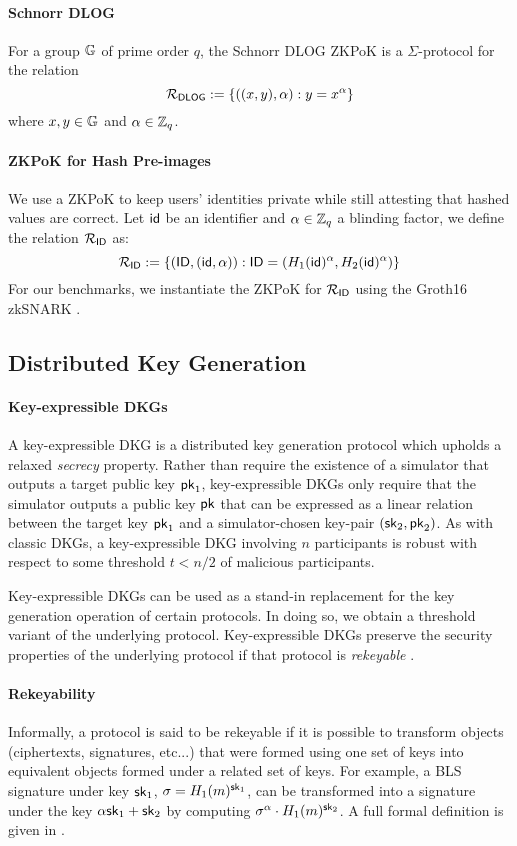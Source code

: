 	\paragraph{Schnorr DLOG} For a group $\mathbb{G}$ of prime order $q$, the Schnorr DLOG ZKPoK is a $\Sigma$-protocol for the relation 
	$$\mathcal{R}_{\mathsf{DLOG}}:= \left\{ ((x, y), \alpha): y = x^\alpha \right\}$$ 
	where $x, y \in \mathbb{G}$ and $\alpha \in \mathbb{Z}_q$.

	\paragraph{ZKPoK for Hash Pre-images} We use a ZKPoK to keep users' identities private while still attesting that hashed values are correct. Let $\mathsf{id}$ be an identifier and $\alpha \in \mathbb{Z}_q$ a blinding factor, we define the relation $\mathcal{R}_{\mathsf{ID}}$ as:
	$$\mathcal{R}_{\mathsf{ID}} := \left\{ \left(\mathsf{ID}, (\mathsf{id}, \alpha)\right): \mathsf{ID} = \left(H_1(\mathsf{id})^\alpha, H_2(\mathsf{id})^\alpha \right) \right\}  $$
	For our benchmarks, we instantiate the ZKPoK for $\mathcal{R}_{\mathsf{ID}}$ using the Groth16 zkSNARK \cite{groth2016size}.

\subsection{Distributed Key Generation}
 
	\paragraph{Key-expressible DKGs} A key-expressible DKG \cite{gurkan2021aggregatable} is a distributed key generation protocol which upholds a relaxed \emph{secrecy} property.
	Rather than require the existence of a simulator that outputs a target public key $\mathsf{pk}_1$, key-expressible DKGs only require that the simulator outputs a public key $\mathsf{pk}$ that can be expressed as a linear relation between the target key $\mathsf{pk}_1$ and a simulator-chosen key-pair $(\mathsf{sk}_2, \mathsf{pk}_2)$.
	As with classic DKGs, a key-expressible DKG involving $n$ participants is robust with respect to some threshold $t < n/2$ of malicious participants.
	
	Key-expressible DKGs can be used as a stand-in replacement for the key generation operation of certain protocols.
	In doing so, we obtain a threshold variant of the underlying protocol.
	Key-expressible DKGs preserve the security properties of the underlying protocol if that protocol is \emph{rekeyable} \cite{gurkan2021aggregatable}.

	\paragraph{Rekeyability} Informally, a protocol is said to be rekeyable if it is possible to transform objects (ciphertexts, signatures, etc...) that were formed using one set of keys into equivalent objects formed under a related set of keys.
	For example, a BLS signature under key $\mathsf{sk}_1$, $\sigma = H_1(m)^{\mathsf{sk}_1}$, can be transformed into a signature under the key $\alpha\mathsf{sk}_1 + \mathsf{sk}_2$ by computing $\sigma^\alpha \cdot H_1(m)^{\mathsf{sk}_2}$.
	A full formal definition is given in \cite{gurkan2021aggregatable}.


